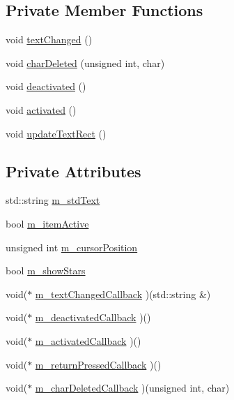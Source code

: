 \subsection*{Private Member Functions}
\begin{CompactItemize}
\item 
void \hyperlink{classsfgui_1_1TextEdit_04bf790d96e0014479cc791691ecbade}{textChanged} ()
\item 
void \hyperlink{classsfgui_1_1TextEdit_8c3d822835999b2b0a38c1ef95eca4ff}{charDeleted} (unsigned int, char)
\item 
void \hyperlink{classsfgui_1_1TextEdit_c5ff761e3933294b46892db32e62b9f6}{deactivated} ()
\item 
void \hyperlink{classsfgui_1_1TextEdit_c009c601675801f2039d8f526e6fc921}{activated} ()
\item 
void \hyperlink{classsfgui_1_1TextEdit_cd1f4ab301db3775216a85066859a647}{updateTextRect} ()
\end{CompactItemize}
\subsection*{Private Attributes}
\begin{CompactItemize}
\item 
std::string \hyperlink{classsfgui_1_1TextEdit_08de851a32aa8dd650e33dfcb376bfd8}{m\_\-stdText}
\item 
bool \hyperlink{classsfgui_1_1TextEdit_8ffa5546b2fd4901837b13a118f9beef}{m\_\-itemActive}
\item 
unsigned int \hyperlink{classsfgui_1_1TextEdit_9392f92ba9efe59f56801ec3c0e52ccb}{m\_\-cursorPosition}
\item 
bool \hyperlink{classsfgui_1_1TextEdit_c4a8a483ad2fcdaa9201489665774e19}{m\_\-showStars}
\item 
void($\ast$ \hyperlink{classsfgui_1_1TextEdit_a6d415ef1daf7f9fdf0dec3d71cb8eab}{m\_\-textChangedCallback} )(std::string \&)
\item 
void($\ast$ \hyperlink{classsfgui_1_1TextEdit_bfa97d7c95f54cc91600375242fe1ea6}{m\_\-deactivatedCallback} )()
\item 
void($\ast$ \hyperlink{classsfgui_1_1TextEdit_9cf910f9fca635f595d6a8963d7e30d1}{m\_\-activatedCallback} )()
\item 
void($\ast$ \hyperlink{classsfgui_1_1TextEdit_d86f9eaadf1313214631b2de009abf55}{m\_\-returnPressedCallback} )()
\item 
void($\ast$ \hyperlink{classsfgui_1_1TextEdit_1538508447c54b9f997fc8a68eb5c097}{m\_\-charDeletedCallback} )(unsigned int, char)
\end{CompactItemize}


